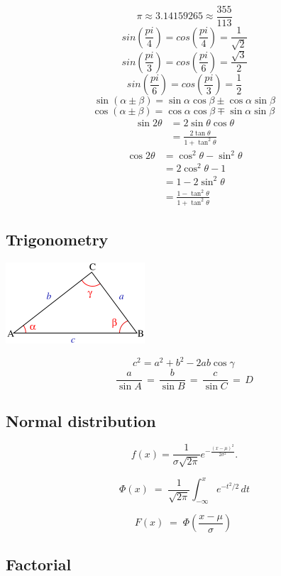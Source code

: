 \documentclass[a4paper,landscape,8pt]{article}
\begin{document}
\begin{multicols}{2}
\[
  \pi \approx 3.14159265 \approx \frac{355}{113}
\]
\[
  sin(\frac{pi}{4}) = cos(\frac{pi}{4}) = \frac{1}{\sqrt{2}}
\]
\[
  sin(\frac{pi}{3}) = cos(\frac{pi}{6}) = \frac{\sqrt{3}}{2}
\]
\[
  sin(\frac{pi}{6}) = cos(\frac{pi}{3}) = \frac{1}{2}
\]
\[
  \sin(\alpha \pm \beta) = \sin \alpha \cos \beta \pm \cos \alpha \sin \beta
\]
\[
  \cos(\alpha \pm \beta) = \cos \alpha \cos \beta \mp \sin \alpha \sin \beta\
\]
\begin{align*}
  \sin 2\theta &= 2 \sin \theta \cos \theta \\
               &= \frac{2 \tan \theta} {1 + \tan^2 \theta}
\end{align*}
\begin{align*}
  \cos 2\theta &= \cos^2 \theta - \sin^2 \theta \\
               &= 2 \cos^2 \theta - 1 \\
               &= 1 - 2 \sin^2 \theta \\
               &= \frac{1 - \tan^2 \theta} {1 + \tan^2 \theta}
\end{align*}

\subsection{Trigonometry}

\includegraphics[scale=0.5]{Triangle_with_notations_2}

\[
 c^2 = a^2 + b^2 - 2ab\cos\gamma\,
\]
\[
 \frac{a}{\sin A} \,=\, \frac{b}{\sin B} \,=\, \frac{c}{\sin C} \,=\, D \!
\]


\subsection{Normal distribution}
\[
  f(x) = \frac{1}{\sigma\sqrt{2\pi}} e^{ -\frac{(x-\mu)^2}{2\sigma^2} }.
\]

\[
 \Phi(x)\; = \;\frac{1}{\sqrt{2\pi}} \int_{-\infty}^x e^{-t^2/2} \, dt
\]

\[
  F(x)\;=\;\Phi\left(\frac{x-\mu}{\sigma}\right)\
\]

\subsection{Factorial}


\end{multicols}
\end{document}
